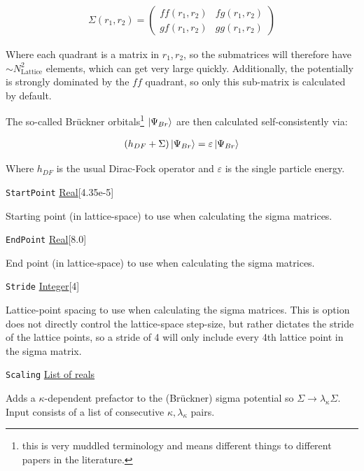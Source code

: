 \documentclass{report}
\begin{document}
\begin{align}
\Sigma(r_1, r_2) = 
\begin{pmatrix}
ff(r_1, r_2)    & fg(r_1, r_2)\\
gf(r_1, r_2)    & gg(r_1, r_2)
\end{pmatrix}
\end{align}

Where each quadrant is a matrix in $r_1, r_2$, so the submatrices will therefore have $\sim
N_{\mathrm{Lattice}}^2$ elements, which can get very large quickly. Additionally, the potentially is
strongly dominated by the $ff$ quadrant, so only this sub-matrix is calculated by default.

The so-called Br\"{u}ckner orbitals\footnote{this is very muddled terminology and 
means different things to different papers in the literature. } $\ket{\Psi_{Br}}$ are then calculated 
self-consistently via:

\begin{align}
\label{eq:brueckner}
(h_{DF} + \Sigma) \ket{\Psi_{Br}} = \varepsilon \ket{\Psi_{Br}}
\end{align}

Where $h_{DF}$ is the usual Dirac-Fock operator and $\varepsilon$ is the single particle energy.

\texttt{StartPoint} \uline{Real}[4.35e-5]
\begin{adjustwidth}{1cm}{}
Starting point (in lattice-space) to use when calculating the sigma matrices.
\end{adjustwidth}

\texttt{EndPoint} \uline{Real}[8.0]
\begin{adjustwidth}{1cm}{}
End point (in lattice-space) to use when calculating the sigma matrices.
\end{adjustwidth}

\texttt{Stride} \uline{Integer}[4]
\begin{adjustwidth}{1cm}{}
Lattice-point spacing to use when calculating the sigma matrices. This is option does not directly
control the lattice-space step-size, but rather dictates the stride of the lattice points, so a stride
of 4 will only include every 4th lattice point in the sigma matrix.
\end{adjustwidth}

\texttt{Scaling} \uline{List of reals}
\begin{adjustwidth}{1cm}{}
Adds a $\kappa$-dependent prefactor to the (Br\"{u}ckner) sigma potential so $\Sigma \to
\lambda_{\kappa}\Sigma$. Input consists of a list of consecutive $\kappa, \lambda_{\kappa}$ pairs.
\end{adjustwidth}
\end{document}
